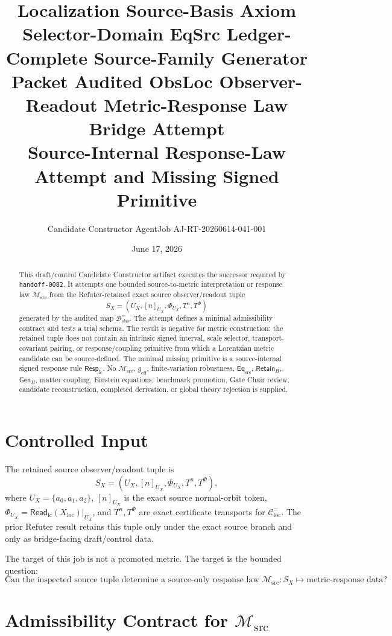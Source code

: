 \documentclass[11pt]{article}
\title{\textbf{Localization Source-Basis Axiom Selector-Domain EqSrc Ledger-Complete Source-Family Generator Packet Audited ObsLoc Observer-Readout Metric-Response Law Bridge Attempt}\\[0.35em]
\large Source-Internal Response-Law Attempt and Missing Signed Primitive}
\author{Candidate Constructor AgentJob AJ-RT-20260614-041-001}
\date{June 17, 2026}
\newcommand{\EqSrc}{\mathsf{Eq}_{\mathrm{src}}}
\newcommand{\ReadLC}{\mathsf{Read}_{\mathrm{lc}}}
\newcommand{\RetainH}{\mathsf{Retain}_{H}}
\newcommand{\GenH}{\mathsf{Gen}_{H}}
\newcommand{\Bobs}{\mathcal{B}^{=}_{\mathrm{obs}}}
\newcommand{\Msrc}{\mathcal{M}_{\mathrm{src}}}
\newcommand{\RespLC}{\mathsf{Resp}_{\mathrm{lc}}}
\newcommand{\geff}{g_{\mathrm{eff}}}
\begin{document}
\maketitle

\begin{abstract}
This draft/control Candidate Constructor artifact executes the
successor required by \texttt{handoff-0082}. It attempts one bounded
source-to-metric interpretation or response law \(\Msrc\) from the
Refuter-retained exact source observer/readout tuple
\[
    S_X=(U_X,[n]_{U_X},\Phi_{U_X},T^n,T^\Phi)
\]
generated by the audited map \(\Bobs\). The attempt defines a minimal
admissibility contract and tests a trial schema. The result is
negative for metric construction: the retained tuple does not contain
an intrinsic signed interval, scale selector, transport-covariant
pairing, or response/coupling primitive from which a Lorentzian metric
candidate can be source-defined. The minimal missing primitive is a
source-internal signed response rule \(\RespLC\). No \(\Msrc\),
\(\geff\), finite-variation robustness, \(\EqSrc\), \(\RetainH\),
\(\GenH\), matter coupling, Einstein equations, benchmark promotion,
Gate Chair review, candidate reconstruction, completed derivation, or
global theory rejection is supplied.
\end{abstract}

\section{Controlled Input}

The retained source observer/readout tuple is
\[
    S_X=(U_X,[n]_{U_X},\Phi_{U_X},T^n,T^\Phi),
\]
where \(U_X=\{a_0,a_1,a_2\}\), \([n]_{U_X}\) is the exact source
normal-orbit token,
\(\Phi_{U_X}=\ReadLC(X_{\mathrm{loc}})|_{U_X}\), and \(T^n,T^\Phi\)
are exact certificate transports for
\(\mathcal{C}^{=}_{\mathrm{loc}}\). The prior Refuter result retains
this tuple only under the exact source branch and only as
bridge-facing draft/control data.

The target of this job is not a promoted metric. The target is the
bounded question:
\[
    \text{Can the inspected source tuple determine a source-only
    response law } \Msrc:S_X\mapsto \text{metric-response data?}
\]

\section{Admissibility Contract for \texorpdfstring{\(\Msrc\)}{Msrc}}
\end{document}
